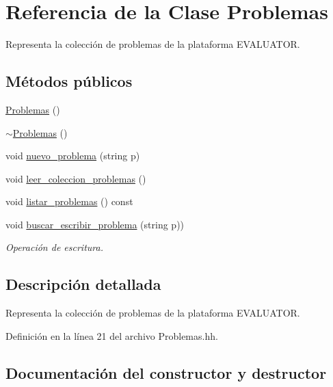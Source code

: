\hypertarget{class_problemas}{}\section{Referencia de la Clase Problemas}
\label{class_problemas}


Representa la colección de problemas de la plataforma E\+V\+A\+L\+U\+A\+T\+OR.  


\subsection*{Métodos públicos}
\begin{DoxyCompactItemize}
\item 
\mbox{\hyperlink{class_problemas_ae587a6825117a5103b50f544a7415c0c}{Problemas}} ()
\item 
\mbox{\hyperlink{class_problemas_aec05a82a712fee2327b6e3f6ce7b4e65}{$\sim$\+Problemas}} ()
\item 
void \mbox{\hyperlink{class_problemas_a1cebce2784b951482651d299be50d8b3}{nuevo\+\_\+problema}} (string p)
\item 
void \mbox{\hyperlink{class_problemas_a6d16937dea64409081e507065e17f2b1}{leer\+\_\+coleccion\+\_\+problemas}} ()
\item 
void \mbox{\hyperlink{class_problemas_a8c3ec08e7f02cc4ce8c2b5e9a3e19f4c}{listar\+\_\+problemas}} () const
\item 
void \mbox{\hyperlink{class_problemas_a36f5cb6d84345475fd7ea80142d7500d}{buscar\+\_\+escribir\+\_\+problema}} (string p))
\begin{DoxyCompactList}\small\item\em Operación de escritura. \end{DoxyCompactList}\end{DoxyCompactItemize}


\subsection{Descripción detallada}
Representa la colección de problemas de la plataforma E\+V\+A\+L\+U\+A\+T\+OR. 

Definición en la línea 21 del archivo Problemas.\+hh.



\subsection{Documentación del constructor y destructor}
\mbox{\label{class_problemas_ae587a6825117a5103b50f544a7415c0c}} 
